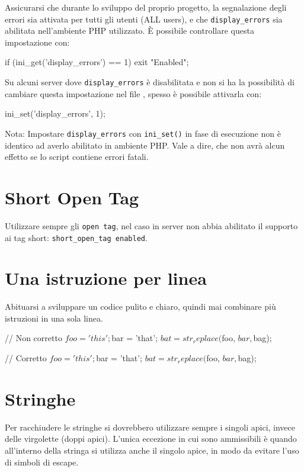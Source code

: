 Assicurarsi che durante lo sviluppo del proprio progetto, la segnalazione degli errori sia attivata per tutti gli utenti (ALL users), e che \verb|display_errors| sia abilitata nell'ambiente \ac{PHP} utilizzato. È possibile controllare questa impostazione con:

\begin{code}
if (ini_get('display_errors') == 1)
{
	exit "Enabled";
}
\end{code}

Su alcuni server dove \verb|display_errors| è disabilitata e non si ha la possibilità di cambiare questa impostazione nel file , spesso è possibile attivarla con:

\begin{code}
ini_set('display_errors', 1);
\end{code}

Nota: Impostare \verb|display_errors| con \verb|ini_set()| in fase di esecuzione non è identico ad averlo abilitato in ambiente \ac{PHP}. Vale a dire, che non avrà alcun effetto se lo script contiene errori fatali.

\section*{Short Open Tag}
Utilizzare sempre gli \verb|open tag|, nel caso in server non abbia abilitato il supporto ai tag short: \verb|short_open_tag enabled|.


\section*{Una istruzione per linea}
Abituarsi a sviluppare un codice pulito e chiaro, quindi mai combinare più istruzioni in una sola linea.

\begin{code}
// Non corretto
$foo = 'this'; $bar = 'that'; $bat = str_replace($foo, $bar, $bag);

// Corretto
$foo = 'this';
$bar = 'that';
$bat = str_replace($foo, $bar, $bag);
\end{code}

\section*{Stringhe}
Per racchiudere le stringhe si dovrebbero utilizzare sempre i singoli apici, invece delle virgolette (doppi apici). L'unica eccezione in cui sono ammissibili è quando all'interno della stringa si utilizza anche il singolo apice, in modo da evitare l'uso di simboli di escape.

